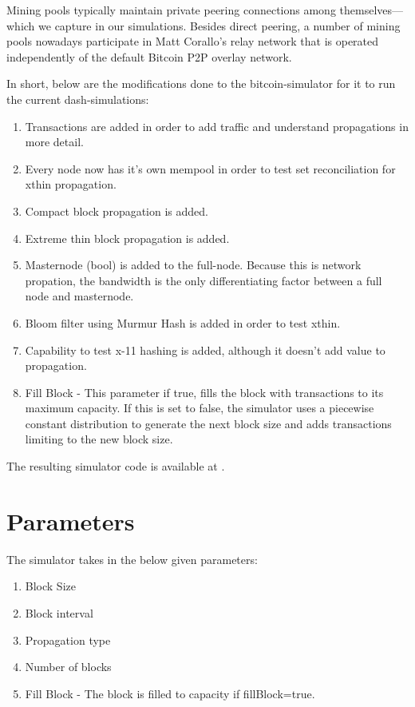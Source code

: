 \documentclass{article}
\begin{document}
Mining pools typically maintain private peering connections among
themselves—which we capture in our simulations. Besides direct peering, a
number of mining pools nowadays participate in Matt Corallo’s relay network
\cite{matt} that is operated independently of the default Bitcoin P2P overlay network.


In short, below are the modifications done to the bitcoin-simulator for it to run the current dash-simulations:

\begin{enumerate}
    \item Transactions are added in order to add traffic and understand propagations in more detail.
    \item Every node now has it's own mempool in order to test set reconciliation for xthin propagation.
    \item Compact block propagation is added.
    \item Extreme thin block propagation is added.
    \item Masternode (bool) is added to the full-node. Because this is network propation, the bandwidth is the only
        differentiating factor between a full node and masternode. 
    \item Bloom filter using Murmur Hash is added in order to test xthin.
    \item Capability to test x-11 hashing is added, although it doesn't add value to propagation. 
    \item Fill Block - This parameter if true, fills the block with transactions to its maximum capacity. If this is set
        to false, the simulator uses a piecewise constant distribution to generate the next block size and adds
        transactions limiting to the new block size. 
\end{enumerate}

The resulting simulator code is available at \cite{sim}.  

\section{Parameters}
The simulator takes in the below given parameters:

\begin{enumerate}
    \item Block Size
    \item Block interval
    \item Propagation type
    \item Number of blocks
    \item Fill Block  - The block is filled to capacity if fillBlock=true.
\end{enumerate}
\end{document}
